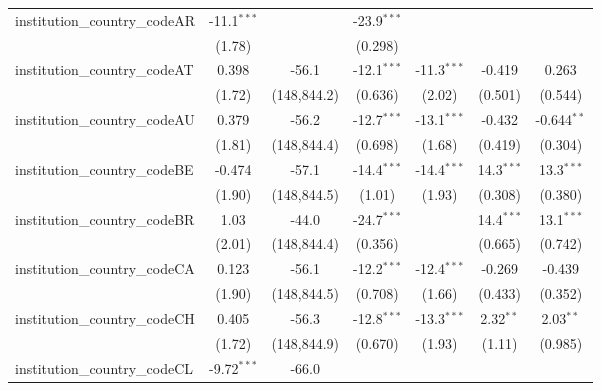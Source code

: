 \begin{tabular}{lcccccc}
   institution\_country\_codeAR          & -11.1$^{***}$ &               & -23.9$^{***}$ &               &               &   \\   
                                         & (1.78)        &               & (0.298)       &               &               &   \\   
   institution\_country\_codeAT          & 0.398         & -56.1         & -12.1$^{***}$ & -11.3$^{***}$ & -0.419        & 0.263\\   
                                         & (1.72)        & (148,844.2)   & (0.636)       & (2.02)        & (0.501)       & (0.544)\\   
   institution\_country\_codeAU          & 0.379         & -56.2         & -12.7$^{***}$ & -13.1$^{***}$ & -0.432        & -0.644$^{**}$\\   
                                         & (1.81)        & (148,844.4)   & (0.698)       & (1.68)        & (0.419)       & (0.304)\\   
   institution\_country\_codeBE          & -0.474        & -57.1         & -14.4$^{***}$ & -14.4$^{***}$ & 14.3$^{***}$  & 13.3$^{***}$\\   
                                         & (1.90)        & (148,844.5)   & (1.01)        & (1.93)        & (0.308)       & (0.380)\\   
   institution\_country\_codeBR          & 1.03          & -44.0         & -24.7$^{***}$ &               & 14.4$^{***}$  & 13.1$^{***}$\\   
                                         & (2.01)        & (148,844.4)   & (0.356)       &               & (0.665)       & (0.742)\\   
   institution\_country\_codeCA          & 0.123         & -56.1         & -12.2$^{***}$ & -12.4$^{***}$ & -0.269        & -0.439\\   
                                         & (1.90)        & (148,844.5)   & (0.708)       & (1.66)        & (0.433)       & (0.352)\\   
   institution\_country\_codeCH          & 0.405         & -56.3         & -12.8$^{***}$ & -13.3$^{***}$ & 2.32$^{**}$   & 2.03$^{**}$\\   
                                         & (1.72)        & (148,844.9)   & (0.670)       & (1.93)        & (1.11)        & (0.985)\\   
   institution\_country\_codeCL          & -9.72$^{***}$ & -66.0         &               &               &               &   \\   

\end{tabular}
